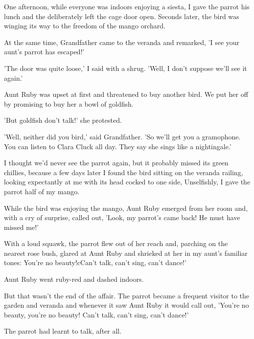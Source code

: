 \par
One afternoon, while everyone was indoors enjoying a siesta, I gave the parrot his lunch and the deliberately left the cage door open. Seconds later, the bird was winging its way to the freedom of the mango orchard.
\par
At the same time, Grandfather came to the veranda and remarked, 'I see your aunt's parrot has escaped!'
\par
'The door was quite loose,' I said with a shrug. 'Well, I don't suppose we'll see it again.'
\par
Aunt Ruby was upset at first and threatened to buy another bird. We put her off by promising to buy her a bowl of goldfish.
\par
'But goldfish don't talk!' she protested.
\par
'Well, neither did you bird,' said Grandfather. 'So we'll get you a gramophone. You can listen to Clara Cluck all day. They say she sings like a nightingale.'
\par
I thought we'd never see the parrot again, but it probably missed its green chillies, because a few days later I found the bird sitting on the veranda railing, looking expectantly at me with its head cocked to one side, Unselfishly, I gave the parrot half of my mango.
\par
While the bird was enjoying the mango, Aunt Ruby emerged from her room and, with a cry of surprise, called out, 'Look, my parrot's came back! He must have missed me!'
\par
With a loud squawk, the parrot flew out of her reach and, parching on the nearest rose bush, glared at Aunt Ruby and shrieked at her in my aunt's familiar tones: You're no beauty!cCan't talk, can't sing, can't dance!'
\par
Aunt Ruby went ruby-red and dashed indoors.
\par
But that wasn't the end of the affair. The parrot became a frequent visitor to the garden and veranda and whenever it saw Aunt Ruby it would call out, 'You're no beauty, you're no beauty! Can't talk, can't sing, can't dance!'
\par
The parrot had learnt to talk, after all.




